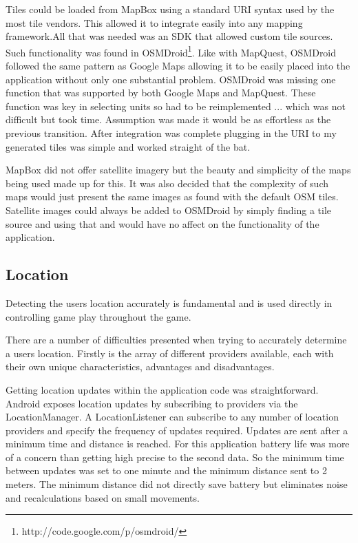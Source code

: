 Tiles could be loaded from MapBox using a standard URI syntax used by the most tile vendors. This allowed it to integrate easily into any mapping framework.All that was needed was an SDK that allowed custom tile sources. Such functionality was found in OSMDroid\footnote{http://code.google.com/p/osmdroid/}. Like with MapQuest, OSMDroid followed the same pattern as Google Maps allowing it to be easily placed into the application without only one substantial problem. OSMDroid was missing one function that was supported by both Google Maps and MapQuest. These function was key in selecting units so had to be reimplemented ... which was not difficult but took time. Assumption was made it would be as effortless as the previous transition. After integration was complete plugging in the URI to my generated tiles was simple and worked straight of the bat.

MapBox did not offer satellite imagery but the beauty and simplicity of the maps being used made up for this. It was also decided that the complexity of such maps would just present the same images as found with the default OSM tiles. Satellite images could always be added to OSMDroid by simply finding a tile source and using that and would have no affect on the functionality of the application. 


\subsection{Location}
Detecting the users location accurately is fundamental and is used directly in controlling game play throughout the game.

There are a number of difficulties presented when trying to accurately determine a users location. Firstly is the array of different providers available, each with their own unique characteristics, advantages and disadvantages.

Getting location updates within the application code was straightforward. Android exposes location updates by subscribing to providers via the LocationManager. A LocationListener can subscribe to any number of location providers and specify the frequency of updates required. Updates are sent after a minimum time and distance is reached. For this application battery life was more of a concern than getting high precise to the second data. So the minimum time between updates was set to one minute and the minimum distance sent to 2 meters. The minimum distance did not directly save battery but eliminates noise and recalculations based on small movements.

